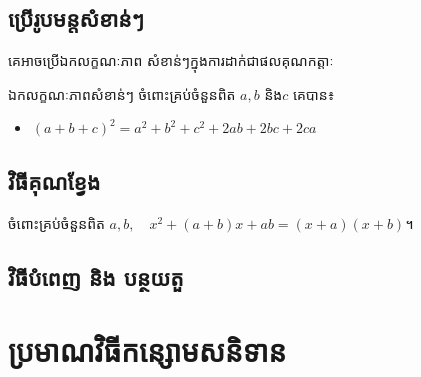 \subsection{ប្រើរូបមន្តសំខាន់ៗ}
គេអាចប្រើឯកលក្ខណៈភាព សំខាន់ៗក្នុងការដាក់ជាផលគុណកត្តាៈ
\begin{property}{ឯកលក្ខណៈភាពសំខាន់ៗ}
ចំពោះគ្រប់ចំនួនពិត $a,b$ និង$c$ គេបាន៖
\begin{itemize}
\item $(a+b+c)^2=a^2+b^2+c^2+2ab+2bc+2ca$
\end{itemize}
\end{property}
\subsection{វិធីគុណខ្វែង}
\begin{generality}
ចំពោះគ្រប់ចំនួនពិត $a,b, \quad x^2+(a+b)x+ab=(x+a)(x+b)$។
\end{generality}
\subsection{វិធីបំពេញ និង បន្ថយតួ}
\section{ប្រមាណវិធីកន្សោមសនិទាន}

\newpage
